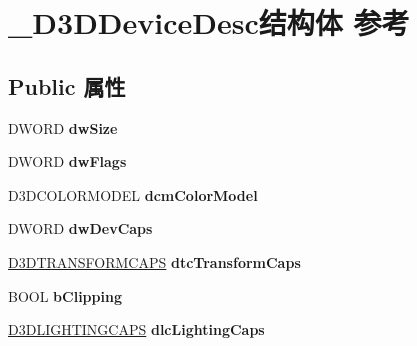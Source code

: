 \hypertarget{struct___d3_d_device_desc}{}\section{\+\_\+\+D3\+D\+Device\+Desc结构体 参考}
\label{struct___d3_d_device_desc}
\subsection*{Public 属性}
\begin{DoxyCompactItemize}
\item 
\mbox{\label{struct___d3_d_device_desc_a1d32cc0fc07a581855c7a1154caea840}} 
D\+W\+O\+RD {\bfseries dw\+Size}
\item 
\mbox{\label{struct___d3_d_device_desc_a36521e534f3b084f14cd7980590cf22c}} 
D\+W\+O\+RD {\bfseries dw\+Flags}
\item 
\mbox{\label{struct___d3_d_device_desc_a9195ef71a3ffc98bc7c1f366b688b5da}} 
D3\+D\+C\+O\+L\+O\+R\+M\+O\+D\+EL {\bfseries dcm\+Color\+Model}
\item 
\mbox{\label{struct___d3_d_device_desc_a5025505fd513c29dfad2c3f1858c0f81}} 
D\+W\+O\+RD {\bfseries dw\+Dev\+Caps}
\item 
\mbox{\label{struct___d3_d_device_desc_a2dc09eab64407364c09ef1f1a1b3b921}} 
\hyperlink{struct___d3_d_t_r_a_n_s_f_o_r_m_c_a_p_s}{D3\+D\+T\+R\+A\+N\+S\+F\+O\+R\+M\+C\+A\+PS} {\bfseries dtc\+Transform\+Caps}
\item 
\mbox{\label{struct___d3_d_device_desc_a2ef2de982f02cbec940b5338e1e1d20c}} 
B\+O\+OL {\bfseries b\+Clipping}
\item 
\mbox{\label{struct___d3_d_device_desc_af7325bc693cb3d93aa9cc8c10d33865a}} 
\hyperlink{struct___d3_d_l_i_g_h_t_i_n_g_c_a_p_s}{D3\+D\+L\+I\+G\+H\+T\+I\+N\+G\+C\+A\+PS} {\bfseries dlc\+Lighting\+Caps}
\item 
\mbox{\label{struct___d3_d_device_desc_a5ab9d2d3b7297afd96b142c6f0da3623}} 

\end{DoxyCompactItemize}
